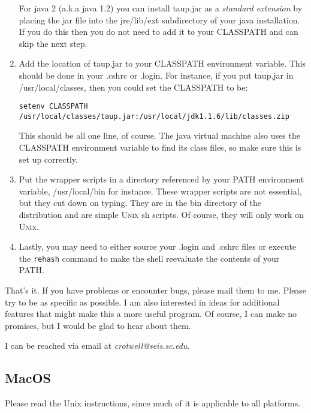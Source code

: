 \begin{enumerate}
For java 2 (a.k.a java 1.2) you can install taup.jar as a \textit{standard extension} by placing the jar file into the jre/lib/ext subdirectory of your java installation. If you do this then you do not need to add it to your CLASSPATH and can skip the next step.

\item Add the location of taup.jar to your CLASSPATH environment variable.
This should be done in your .cshrc or .login. For instance, if you put taup.jar in
/usr/local/classes, then you could set the CLASSPATH to be:
\begin{verbatim}
setenv CLASSPATH /usr/local/classes/taup.jar:/usr/local/jdk1.1.6/lib/classes.zip
\end{verbatim} 

This should be all one line, of course.
The java virtual machine also uses the CLASSPATH environment variable to find
its class files, so make sure this is set up correctly.

\item Put the wrapper scripts in a directory referenced by your PATH environment
variable, /usr/local/bin for instance. These wrapper 
scripts are not essential, but they cut down on 
typing. They are in the bin directory of the distribution 
and are simple \textsc{Unix} sh scripts.
Of course, they will only work on \textsc{Unix}.

\item Lastly, you may need to either source your .login and .cshrc files or
execute the \texttt{rehash} command to make the shell reevaluate the 
contents of your PATH.

\end{enumerate}

That's it. If you have problems or encounter bugs, please mail them to me.
Please try to be as specific as possible. I am also interested in ideas for
additional features that might make this a more useful program. 
Of course, I can make no promises,
but I would be glad to hear about them.

I can be reached via email at \textit{crotwell@seis.sc.edu}.

\subsection{MacOS}

Please read the Unix instructions, since much of it is applicable to all platforms.

